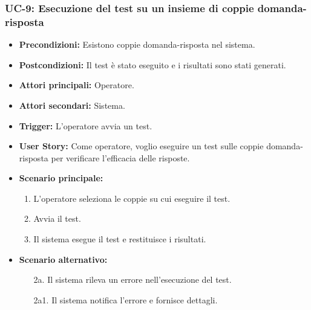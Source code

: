 \documentclass[a4paper, 12pt]{article}
\begin{document}
\subsubsection{UC-9: Esecuzione del test su un insieme di coppie domanda-risposta}
\begin{itemize}
    \item \textbf{Precondizioni:} Esistono coppie domanda-risposta nel sistema.
    \item \textbf{Postcondizioni:} Il test è stato eseguito e i risultati sono stati generati.
    \item \textbf{Attori principali:} Operatore.
    \item \textbf{Attori secondari:} Sistema.
    \item \textbf{Trigger:} L'operatore avvia un test.
    \item \textbf{User Story:} Come operatore, voglio eseguire un test sulle coppie domanda-risposta per verificare l'efficacia delle risposte.
    \item \textbf{Scenario principale:}
    \begin{enumerate}
        \item L'operatore seleziona le coppie su cui eseguire il test.
        \item Avvia il test.
        \item Il sistema esegue il test e restituisce i risultati.
    \end{enumerate}
    \item \textbf{Scenario alternativo:}
    \begin{enumerate}
        \item[2a.] Il sistema rileva un errore nell'esecuzione del test.
        \item[2a1.] Il sistema notifica l'errore e fornisce dettagli.
    \end{enumerate}
\end{itemize}
\end{document}
